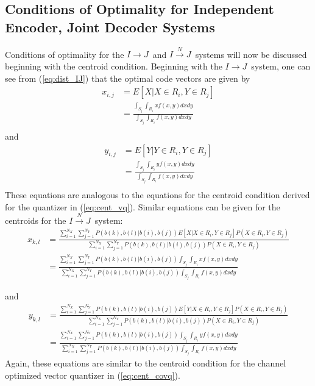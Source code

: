 \documentclass[10pt]{article}
\newcommand{\sysIJN}{\mbox{$I \overset{N}{\rightarrow} J$}}
\newcommand{\sysIJ}{\mbox{$I \rightarrow J$}}
\begin{document}
\subsection{Conditions of Optimality for Independent Encoder, Joint Decoder Systems}
Conditions of optimality for the \sysIJ\ and \sysIJN\ systems will now be discussed beginning with the centroid condition. Beginning with the \sysIJ\ system, one can see from (\ref{eq:dist_IJ}) that the optimal code vectors are given by
\begin{align}
x_{i,j} &= E[X | X \in R_i, Y \in R_j] \\
&= \frac{ \int_{S_j}\int_{R_i}xf(x,y)dxdy }{ \int_{S_j}\int_{R_i}f(x,y)dxdy } \\
\end{align}
and
\begin{align}
y_{i,j} &= E[Y | Y \in R_i, Y \in R_j] \\
&= \frac{ \int_{S_j}\int_{R_i}yf(x,y)dxdy }{ \int_{S_j}\int_{R_i}f(x,y)dxdy } \\
\end{align}
These equations are analogous to the equations for the centroid condition derived for the quantizer in (\ref{eq:cent_vq}). Similar equations can be given for the centroids for the \sysIJN\ system:
\begin{align}
  x_{k,l} &= \frac{\sum_{i=1}^{N_X} \sum_{j=1}^{N_Y} P(b(k),b(l)|b(i),b(j))E[X | X \in R_i, Y \in R_j] P(X \in R_i, Y \in R_j)}
{\sum_{i=1}^{N_X} \sum_{j=1}^{N_Y} P(b(k),b(l)|b(i),b(j))P(X \in R_i, Y \in R_j)} \\
  &= \frac{\sum_{i=1}^{N_X} \sum_{j=1}^{N_Y} P(b(k),b(l)|b(i),b(j))\int_{S_j} \int_{R_i} xf(x,y)dxdy}
{\sum_{i=1}^{N_X} \sum_{j=1}^{N_Y} P(b(k),b(l)|b(i),b(j))\int_{S_j} \int_{R_i} f(x,y)dxdy}
\end{align}

and
\begin{align}
  y_{k,l} &= \frac{\sum_{i=1}^{N_X} \sum_{j=1}^{N_Y} P(b(k),b(l)|b(i),b(j))E[Y | X \in R_i, Y \in R_j] P(X \in R_i, Y \in R_j)}
{\sum_{i=1}^{N_X} \sum_{j=1}^{N_Y} P(b(k),b(l)|b(i),b(j))P(X \in R_i, Y \in R_j)} \\
  &= \frac{\sum_{i=1}^{N_X} \sum_{j=1}^{N_Y} P(b(k),b(l)|b(i),b(j))\int_{S_j} \int_{R_i} yf(x,y)dxdy}
{\sum_{i=1}^{N_X} \sum_{j=1}^{N_Y} P(b(k),b(l)|b(i),b(j))\int_{S_j} \int_{R_i} f(x,y)dxdy}
\end{align}
Again, these equations are similar to the centroid condition for the channel optimized vector quantizer in (\ref{eq:cent_covq}).
\end{document}
